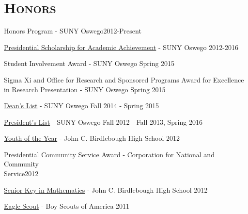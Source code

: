 \documentclass[8pt]{article}
\renewenvironment{itemize}{
  \begin{list}{}{
    \setlength{\leftmargin}{1.5em}
  }
}{
  \end{list}
}
\begin{document}
\section*{\textsc{Honors}}

\begin{itemize}
\item Honors Program - SUNY Oswego\hfill 2012-Present
\item \href{http://oswegocountytoday.com/local-residents-receive-suny-oswego-scholarships/}{Presidential Scholarship for Academic Achievement} - SUNY Oswego  \hfill 2012-2016
\item Student Involvement Award - SUNY Oswego \hfill Spring 2015
\item Sigma Xi and Office for Research and Sponsored Programs Award for Excellence in Research Presentation - SUNY Oswego \hfill Spring 2015
\item \href{http://meritpages.com/Kroffo}{Dean's List} - SUNY Oswego \hfill Fall 2014 - Spring 2015
\item \href{http://meritpages.com/Kroffo}{President's List} - SUNY Oswego \hfill Fall 2012 - Fall 2013, Spring 2016
\item \href{http://www.oswegocountyweeklies.com/phoenix_register.php?details&story_id=5101&story_year=2012&story_month=5}{Youth of the Year} - John C. Birdlebough High School \hfill 2012
\item Presidential Community Service Award - Corporation for National and Community \\Service\hfill 2012
\item \href{http://www.oswegocountyweeklies.com/phoenix_register.php?details&story_id=5503&story_year=2012&story_month=6}{Senior Key in Mathematics} - John C. Birdlebough High School \hfill 2012
\item \href{http://www.oswegocountyweeklies.com/phoenix_register.php?details&story_id=6083&story_year=2012&story_month=8}{Eagle Scout} - Boy Scouts of America \hfill 2011
\end{itemize}
\end{document}
